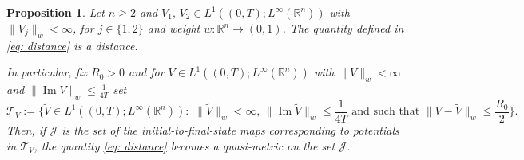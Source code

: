 \documentclass[10pt,a4paper]{amsart}
\newtheorem{proposition}{Proposition}
\def\Im{\mathop\mathrm{Im}}
\newcommand{\R}{\mathbb{R}}
\def\cal{\mathcal}
\def\wt{\widetilde}
\begin{document}
\begin{proposition}\label{prop: distance}
Let $n\geq 2$ and $V_1, \, V_2 \in L^1((0, T); L^\infty(\R^n))$ with $\| V_j \|_w < \infty$, for $j\in\{1, 2\}$ and weight $w:\R^n \to (0, 1)$. The quantity defined in \eqref{eq: distance} is a distance. 

In particular, fix $R_0>0$ and for $V \in L^1((0, T); L^\infty(\R^n))$ with $\| V \|_w < \infty$ and $\| \Im {V} \|_w\leq \frac{1}{4T}$ set 
%
\[
\cal {T}_V := \{\wt{ V} \in  L^1((0, T); L^\infty(\R^n)) : \,\, \| \wt{V} \|_w<\infty, \, \| \Im \wt{V} \|_w \leq \frac{1}{4T} \,\,
%
\text{and such that} \,\, 
%
\| V - \wt{V} \|_w \leq \frac{R_0}{2} \}.
\]
%
Then, if $\cal J$ is the set of the initial-to-final-state maps corresponding to potentials in $ \cal T_V$, the quantity \eqref{eq: distance} becomes a quasi-metric on the set $\cal J$.
\end{proposition}
\end{document}

